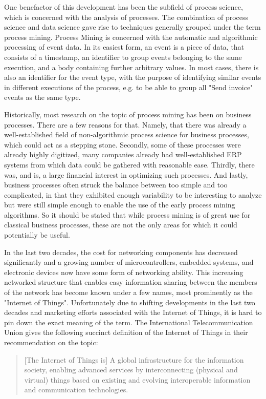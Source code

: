 \documentclass[runningheads]{template/llncs}
\begin{document}
One benefactor of this development has been the subfield of process science, which is concerned with the analysis of processes.
The combination of process science and data science gave rise to techniques generally grouped under the term process mining.
Process Mining  \cite{Aals16} is concerned with the automatic and algorithmic processing of event data. In its easiest form, an event is a piece of data, that consists of a timestamp, an identifier to group events belonging to the same execution, and a body containing further arbitrary values.
In most cases, there is also an identifier for the event type, with the purpose of identifying similar events in different executions of the process, e.g. to be able to group all "Send invoice" events as the same type.

Historically, most research on the topic of process mining has been on business processes. 
There are a few reasons for that. 
Namely, that there was already a well-established field of non-algorithmic process science for business processes, which could act as a stepping stone.
Secondly, some of these processes were already highly digitized, many companies already had well-established ERP systems from which data could be gathered with reasonable ease.
Thirdly, there was, and is, a large financial interest in optimizing such processes.
And lastly, business processes often struck the balance between too simple and too complicated, in that they exhibited enough variability to be interesting to analyze but were still simple enough to enable the use of the early process mining algorithms.
So it should be stated that while process mining is of great use for classical business processes, these are not the only areas for which it could potentially be useful.

In the last two decades, the cost for networking components has decreased significantly and a growing number of microcontrollers, embedded systems, and electronic devices now have some form of networking ability.
This increasing networked structure that enables easy information sharing between the members of the network has become known under a few names, most prominently as the "Internet of Things".
Unfortunately due to shifting developments in the last two decades and marketing efforts associated with the Internet of Things, it is hard to pin down the exact meaning of the term. 
The International Telecommunication Union gives the following succinct definition of the Internet of Things in their recommendation \cite{ITUT12} on the topic:
\blockquote{[The Internet of Things is] A  global  infrastructure  for  the  information  society,  enabling  advanced  services  by  interconnecting  (physical  and  virtual)  things  based  on  existing  and  evolving  interoperable information and communication technologies.}
\end{document}
